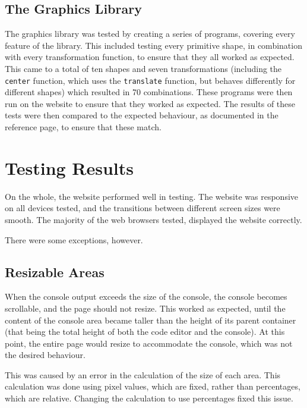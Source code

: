 \documentclass[../main.tex]{subfiles}
\begin{document}
        \subsection{The Graphics Library}
            The graphics library was tested by creating a series of programs, covering
                every feature of the library.
            This included testing every primitive shape, in combination with every
                transformation function, to ensure that they all worked as expected.
            This came to a total of ten shapes and seven transformations (including the
                \texttt{center} function, which uses the \texttt{translate} function, but
                behaves differently for different shapes) which resulted in 70 combinations.
            These programs were then run on the website to ensure that they worked as
                expected.
            The results of these tests were then compared to the expected behaviour, as
                documented in the reference page, to ensure that these match.

    \section{Testing Results}
        On the whole, the website performed well in testing.
        The website was responsive on all devices tested, and the transitions between
            different screen sizes were smooth.
        The majority of the web browsers tested, displayed the website correctly.

        There were some exceptions, however.

        \subsection{Resizable Areas}
            When the console output exceeds the size of the console, the console becomes
                scrollable, and the page should not resize.
            This worked as expected, until the content of the console area became taller
                than the height of its parent container (that being the total height of both
                the code editor and the console).
            At this point, the entire page would resize to accommodate the console, which
                was not the desired behaviour.

            This was caused by an error in the calculation of the size of each area.
            This calculation was done using pixel values, which are fixed, rather than
                percentages, which are relative.
            Changing the calculation to use percentages fixed this issue.
\end{document}
